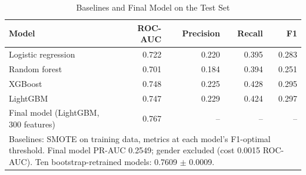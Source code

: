 \begin{table}[t]
\caption{Baselines and Final Model on the Test Set}
\label{tab:models}
\centering
\setlength{\tabcolsep}{4pt}
\begin{tabular}{lrrrr}
\hline
\textbf{Model} & \textbf{ROC-AUC} & \textbf{Precision} & \textbf{Recall} & \textbf{F1} \\
\hline
Logistic regression & 0.722 & 0.220 & 0.395 & 0.283 \\
Random forest & 0.701 & 0.184 & 0.394 & 0.251 \\
XGBoost & 0.748 & 0.225 & 0.428 & 0.295 \\
LightGBM & 0.747 & 0.229 & 0.424 & 0.297 \\
\hline
Final model (LightGBM, 300 features) & 0.767 & -- & -- & -- \\
\hline
\multicolumn{5}{p{0.92\linewidth}}{\footnotesize Baselines: SMOTE on training data, metrics at each model's F1-optimal threshold. Final model PR-AUC 0.2549; gender excluded (cost 0.0015 ROC-AUC). Ten bootstrap-retrained models: 0.7609 $\pm$ 0.0009.} \\
\end{tabular}
\end{table}
